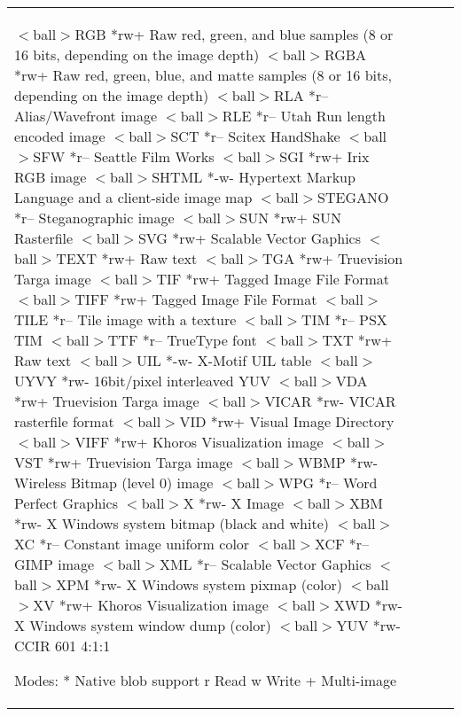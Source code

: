 \begin{longtable}{llll}
$<$ball$>$RGB	*rw+	Raw red, green, and blue samples (8 or
		16 bits, depending on the image depth)
$<$ball$>$RGBA	*rw+	Raw red, green, blue, and matte samples
		(8 or 16 bits, depending on the image
		depth)
$<$ball$>$RLA	*r--	Alias/Wavefront image
$<$ball$>$RLE	*r--	Utah Run length encoded image
$<$ball$>$SCT	*r--	Scitex HandShake
$<$ball$>$SFW	*r--	Seattle Film Works
$<$ball$>$SGI	*rw+	Irix RGB image
$<$ball$>$SHTML	*-w-	Hypertext Markup Language and a client-side
		image map
$<$ball$>$STEGANO	*r--	Steganographic image
$<$ball$>$SUN	*rw+	SUN Rasterfile
$<$ball$>$SVG	*rw+	Scalable Vector Gaphics
$<$ball$>$TEXT	*rw+	Raw text
$<$ball$>$TGA	*rw+	Truevision Targa image
$<$ball$>$TIF	*rw+	Tagged Image File Format
$<$ball$>$TIFF	*rw+	Tagged Image File Format
$<$ball$>$TILE	*r--	Tile image with a texture
$<$ball$>$TIM	*r--	PSX TIM
$<$ball$>$TTF	*r--	TrueType font
$<$ball$>$TXT	*rw+	Raw text
$<$ball$>$UIL	*-w-	X-Motif UIL table
$<$ball$>$UYVY	*rw-	16bit/pixel interleaved YUV
$<$ball$>$VDA	*rw+	Truevision Targa image
$<$ball$>$VICAR	*rw-	VICAR rasterfile format
$<$ball$>$VID	*rw+	Visual Image Directory
$<$ball$>$VIFF	*rw+	Khoros Visualization image
$<$ball$>$VST	*rw+	Truevision Targa image
$<$ball$>$WBMP	*rw-	Wireless Bitmap (level 0) image
$<$ball$>$WPG	*r--	Word Perfect Graphics
$<$ball$>$X	*rw-	X Image
$<$ball$>$XBM	*rw-	X Windows system bitmap (black and white)
$<$ball$>$XC	*r--	Constant image uniform color
$<$ball$>$XCF	*r--	GIMP image
$<$ball$>$XML	*r--	Scalable Vector Gaphics
$<$ball$>$XPM	*rw-	X Windows system pixmap (color)
$<$ball$>$XV	*rw+	Khoros Visualization image
$<$ball$>$XWD	*rw-	X Windows system window dump (color)
$<$ball$>$YUV	*rw-	CCIR 601 4:1:1
		
Modes:		
	*	Native blob support
	r	Read
	w	Write
	+	Multi-image

\end{longtable}
